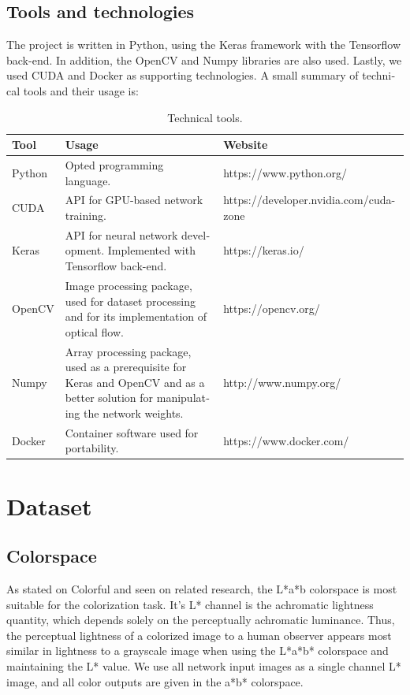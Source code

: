 \documentclass[12pt,openright,oneside,a4paper,english]{abntex2}
\begin{document}
\begin{otherlanguage}{english}
\subsection{Tools and technologies}
The project is written in Python, using the Keras framework with the Tensorflow back-end. In addition, the OpenCV and Numpy libraries are also used. Lastly, we used CUDA and Docker as supporting technologies. A small summary of technical tools and their usage is:

\begin{table}[H]
    \centering
    \begin{tabular}{l|l|l|l}
    Tool            & \multicolumn{2}{l|}{Usage}                 & Website             \\ \hline
    Python          & \multicolumn{2}{p{6cm}|}{Opted programming language.} & https://www.python.org/ \\ \hline
    CUDA            & \multicolumn{2}{p{6cm}|}{API for GPU-based network training.}  & https://developer.nvidia.com/cuda-zone \\ \hline
    Keras           & \multicolumn{2}{p{6cm}|}{API for neural network development. Implemented with Tensorflow back-end.}  & https://keras.io/   \\ \hline
    OpenCV          & \multicolumn{2}{p{6cm}|}{Image processing package, used for dataset processing and for its implementation of optical flow.}  & https://opencv.org/ \\ \hline
    Numpy           & \multicolumn{2}{p{6cm}|}{Array processing package, used as a prerequisite for Keras and OpenCV and as a better solution for manipulating the network weights.}  & http://www.numpy.org/ \\ \hline
    Docker          &  \multicolumn{2}{p{6cm}|}{Container software used for portability.}  & https://www.docker.com/ \\ \hline
    \end{tabular}
    \label{table:tools}
    \caption{Technical tools.}
\end{table}

\section{Dataset}
\subsection{Colorspace}
As stated on Colorful \cite{colorful} and seen on related research, the L*a*b colorspace is most suitable for the colorization task. It's L* channel is the achromatic lightness quantity, which depends solely on the perceptually achromatic luminance. Thus, the perceptual lightness of a colorized image to a human observer appears most similar in lightness to a grayscale image when using the L*a*b* colorspace and maintaining the L* value. We use all network input images as a single channel L* image, and all color outputs are given in the a*b* colorspace.


\end{otherlanguage}
\end{document}

